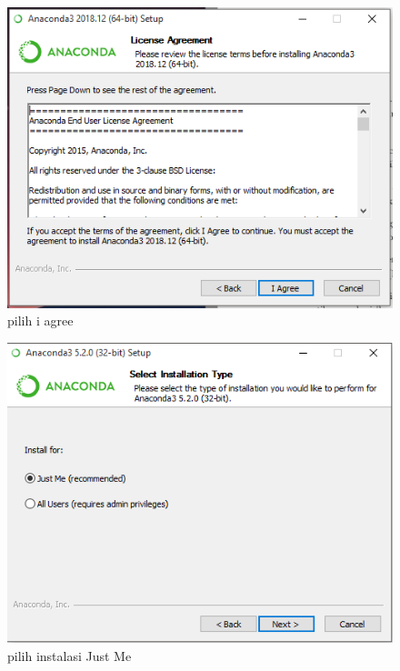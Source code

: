 \begin{enumerate}
\begin{figure}[ht]
\centerline{\includegraphics[width=1\textwidth]{figures/fathi/3.PNG}}
\caption{pilih i agree}
\label{proses3}
\end{figure}
\begin{figure}
\centerline{\includegraphics[width=1\textwidth]{figures/fathi/4.PNG}}
\caption{pilih instalasi Just Me}
\label{proses4}


\end{figure}
\end{enumerate}
